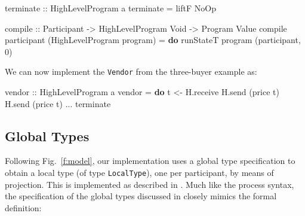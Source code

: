 \documentclass[runningheads,plain]{llncs}
\newcommand{\checkthis}[1]{#1}
\newenvironment{Shaded}{}{}
\newcommand{\KeywordTok}[1]{\textcolor[rgb]{0.00,0.44,0.13}{\textbf{#1}}}
\newcommand{\DataTypeTok}[1]{\textcolor[rgb]{0.56,0.13,0.00}{#1}}
\newcommand{\DecValTok}[1]{\textcolor[rgb]{0.25,0.63,0.44}{#1}}
\newcommand{\OtherTok}[1]{\textcolor[rgb]{0.00,0.44,0.13}{#1}}
\newcommand{\FunctionTok}[1]{\textcolor[rgb]{0.02,0.16,0.49}{#1}}
\newcommand{\NormalTok}[1]{#1}
\begin{document}
\begin{Shaded}
\begin{Highlighting}[]
\OtherTok{terminate ::} \DataTypeTok{HighLevelProgram}\NormalTok{ a}
\NormalTok{terminate }\FunctionTok{=}\NormalTok{ liftF }\DataTypeTok{NoOp}

\OtherTok{compile ::} \DataTypeTok{Participant} \OtherTok{->} \DataTypeTok{HighLevelProgram} \DataTypeTok{Void} \OtherTok{->} \DataTypeTok{Program} \DataTypeTok{Value}
\NormalTok{compile participant (}\DataTypeTok{HighLevelProgram}\NormalTok{ program) }\FunctionTok{=} \KeywordTok{do}
\NormalTok{    runStateT program (participant, }\DecValTok{0}\NormalTok{) }
\end{Highlighting}
\end{Shaded}

We can now implement the \texttt{Vendor} from the three-buyer example as:

\begin{Shaded}
\begin{Highlighting}[]
\OtherTok{vendor ::} \DataTypeTok{HighLevelProgram}\NormalTok{ a}
\NormalTok{vendor }\FunctionTok{=} \KeywordTok{do}
\NormalTok{    t }\OtherTok{<-}\NormalTok{ H.receive}
\NormalTok{    H.send (price t)}
\NormalTok{    H.send (price t)}
    \FunctionTok{...}
\NormalTok{    terminate}
\end{Highlighting}
\end{Shaded}

\subsection{Global Types}
Following Fig.~\ref{f:model}, \checkthis{our implementation uses a global type specification to obtain a local type (of type \texttt{LocalType}), one per participant, by means of projection. This is  implemented as described in  }.
Much like the process syntax, the specification of the global types discussed in  closely mimics the formal definition:
\end{document}
